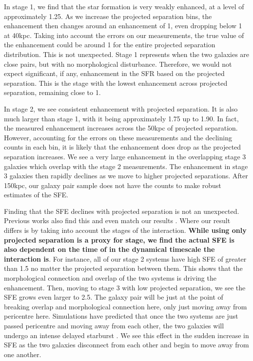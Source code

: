 \documentclass[fleqn,usenatbib]{mnras}
\begin{document}
In stage 1, we find that the star formation is very weakly enhanced, at a level of approximately 1.25. As we increase the projected separation bins, the enhancement then changes around an enhancement of 1, even dropping below 1 at 40kpc. Taking into account the errors on our measurements, the true value of the enhancement could be around 1 for the entire projected separation distribution. This is not unexpected. Stage 1 represents when the two galaxies are close pairs, but with no morphological disturbance. Therefore, we would not expect significant, if any, enhancement in the SFR based on the projected separation. This is the stage with the lowest enhancement across projected separation, remaining close to 1.

In stage 2, we see consistent enhancement with projected separation. It is also much larger than stage 1, with it being approximately 1.75 up to 1.90. In fact, the measured enhancement increases across the 50kpc of projected separation. However, accounting for the errors on these measurements and the declining counts in each bin, it is likely that the enhancement does drop as the projected separation increases. We see a very large enhancement in the overlapping stage 3 galaxies which overlap with the stage 2 measurements. The enhancement in stage 3 galaxies then rapidly declines as we move to higher projected separations. After 150kpc, our galaxy pair sample does not have the counts to make robust estimates of the SFE.

Finding that the SFE declines with projected separation is not an unexpected. Previous works also find this and even match our results \citep{2000ApJ...530..660B, 2008AJ....135.1877E, 2013MNRAS.433L..59P}. Where our result differs is by taking into account the stages of the interaction. \textbf{While using only projected separation is a proxy for stage, we find the actual SFE is also dependent on the time of in the dynamical timescale the interaction is}. For instance, all of our stage 2 systems have high SFE of greater than 1.5 no matter the projected separation between them. This shows that the morphological connection and overlap of the two systems is driving the enhancement. Then, moving to stage 3 with low projected separation, we see the SFE grows even larger to 2.5. The galaxy pair will be just at the point of breaking overlap and morphological connection here, only just moving away from pericentre here. Simulations have predicted that once the two systems are just passed pericentre and moving away from each other, the two galaxies will undergo an intense delayed starburst \citep{2015MNRAS.448.1107M}. We see this effect in the sudden increase in SFE as the two galaxies disconnect from each other and begin to move away from one another. 
\end{document}
